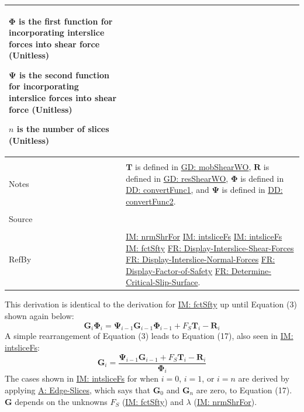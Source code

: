 \documentclass[12pt]{article}
\begin{document}
\begin{minipage}{\textwidth}
\begin{tabular}{p{} p{}}
\begin{symbDescription}
              \item{$\mathbf{Φ}$ is the first function for incorporating interslice forces into shear force (Unitless)}
              \item{$\mathbf{Ψ}$ is the second function for incorporating interslice forces into shear force (Unitless)}
              \item{$n$ is the number of slices (Unitless)}
              \end{symbDescription}
\\ \midrule \\
Notes & $\mathbf{T}$ is defined in \hyperref[GD:mobShearWO]{GD: mobShearWO}, $\mathbf{R}$ is defined in \hyperref[GD:resShearWO]{GD: resShearWO}, $\mathbf{Φ}$ is defined in \hyperref[DD:convertFunc1]{DD: convertFunc1}, and $\mathbf{Ψ}$ is defined in \hyperref[DD:convertFunc2]{DD: convertFunc2}.
\\ \midrule \\
Source & \cite{chen2005}
\\ \midrule \\
RefBy & \hyperref[IM:nrmShrFor]{IM: nrmShrFor} \hyperref[IM:intsliceFs]{IM: intsliceFs} \hyperref[IM:intsliceFs]{IM: intsliceFs} \hyperref[IM:fctSfty]{IM: fctSfty} \hyperref[displayShear]{FR: Display-Interslice-Shear-Forces} \hyperref[displayNormal]{FR: Display-Interslice-Normal-Forces} \hyperref[displayFS]{FR: Display-Factor-of-Safety} \hyperref[determineCritSlip]{FR: Determine-Critical-Slip-Surface}.
\\ \bottomrule \end{tabular}
\end{minipage}
This derivation is identical to the derivation for \hyperref[IM:fctSfty]{IM: fctSfty} up until Equation (3) shown again below:
\begin{displaymath}
{\mathbf{G}}_{i} {\mathbf{Φ}}_{i}={\mathbf{Ψ}}_{i-1} {\mathbf{G}}_{i-1} {\mathbf{Φ}}_{i-1}+{F_{S}} {\mathbf{T}}_{i}-{\mathbf{R}}_{i}
\end{displaymath}
A simple rearrangement of Equation (3) leads to Equation (17), also seen in \hyperref[IM:intsliceFs]{IM: intsliceFs}:
\begin{displaymath}
{\mathbf{G}}_{i}=\frac{{\mathbf{Ψ}}_{i-1} {\mathbf{G}}_{i-1}+{F_{S}} {\mathbf{T}}_{i}-{\mathbf{R}}_{i}}{{\mathbf{Φ}}_{i}}
\end{displaymath}
The cases shown in \hyperref[IM:intsliceFs]{IM: intsliceFs} for when $i=0$, $i=1$, or $i=n$ are derived by applying \hyperref[assumpES]{A: Edge-Slices}, which says that ${\mathbf{G}}_{0}$ and ${\mathbf{G}}_{n}$ are zero, to Equation (17). $\mathbf{G}$ depends on the unknowns ${F_{S}}$ (\hyperref[IM:fctSfty]{IM: fctSfty}) and $λ$ (\hyperref[IM:nrmShrFor]{IM: nrmShrFor}).
\par~
\end{document}
